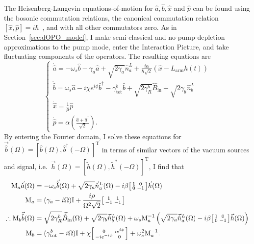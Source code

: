 The Heisenberg-Langevin equations-of-motion for $\hat a, \hat b, \hat x$ and $\hat p$ can be found using the bosonic commutation relations, the canonical commutation relation $[\hat x,\hat p]=i\hbar$~\cite{}, and with all other commutators zero. As in Section~\ref{sec:dOPO_model}, I make semi-classical and no-pump-depletion approximations to the pump mode, enter the Interaction Picture, and take fluctuating components of the operators. The resulting equations are
\begin{equation}\label{eq:dIS_EoM}\begin{cases}
\dot{\hat a}=-\omega_s \hat b- \gamma_a \hat{a} + \sqrt{2\gamma_a}\hat{n}^L_a+\frac{i \alpha}{\hbar\sqrt2}(\hat{x}-L_\mathrm{arm}h(t)) \\
\dot{\hat b}=\omega_s \hat a-i\chi e^{i\phi} \hat b^\dag - \gamma^b_\mathrm{tot} \hat{b} + \sqrt{2\gamma^b_R}\hat{B}_\mathrm{in} + \sqrt{2\gamma_b}\hat{n}^L_b\\
\dot{\hat x}=\frac{1}{\mu}\hat p\\
\dot{\hat p}=\alpha(\frac{\hat{a}+\hat{a}^\dag}{\sqrt{2}}).
\end{cases}\end{equation}
By entering the Fourier domain, I solve these equations for $\vec{\hat b}(\Omega)=[\hat b(\Omega),\hat b^\dag(-\Omega)]^\text{T}$ in terms of similar vectors of the vacuum sources and signal, i.e.\ $\vec h(\Omega)=[\tilde h(\Omega),\tilde h^*(-\Omega)]^\text{T}$, I find that
\begin{align}
\text{M}_a\vec{\hat a}(\Omega)&=-\omega_s\vec{\hat b}(\Omega) + \sqrt{2\gamma_a}\vec{\hat n}^L_a(\Omega)-i\beta\begin{bsmallmatrix}1 & 0 \\0 & -1\end{bsmallmatrix}\vec h(\Omega) \\
\text{M}_a&= (\gamma_a-i \Omega)\text{I}+\frac{i \rho}{\Omega^2 \sqrt 2}\begin{bsmallmatrix}1 & 1 \\-1 & -1\end{bsmallmatrix} \\
\therefore\text{M}_b\vec{\hat b}(\Omega)&=\sqrt{2\gamma^b_R}\vec{\hat B}_\mathrm{in}(\Omega) + \sqrt{2\gamma_b}\vec{\hat n}^L_b(\Omega)+\omega_s \text{M}_a^{-1}\left(\sqrt{2\gamma_a}\vec{\hat n}^L_a(\Omega)-i\beta\begin{bsmallmatrix}1 & 0 \\0 & -1\end{bsmallmatrix}\vec h(\Omega)\right)\\
\text{M}_b&= (\gamma^b_\mathrm{tot}-i \Omega)\text{I}+\chi \begin{bsmallmatrix}0 & i e^{i\phi}\\-i e^{-i\phi} & 0\end{bsmallmatrix}+\omega_s^2\text{M}_a^{-1}.
\end{align}
